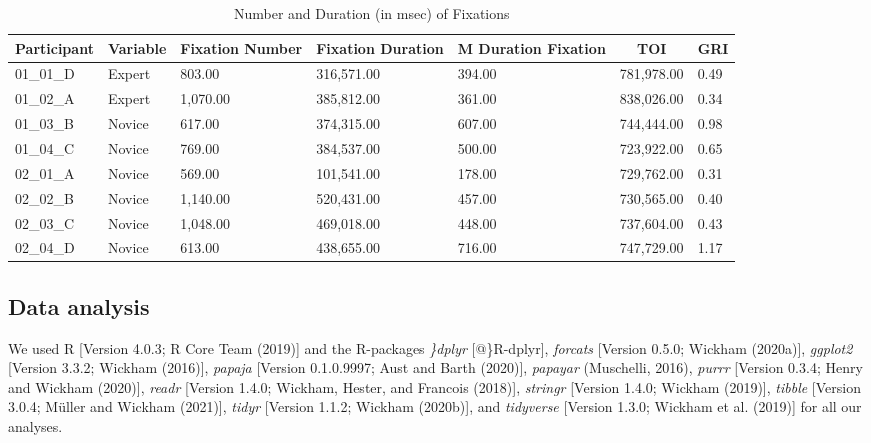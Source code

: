 \documentclass[
  english,
  man,floatsintext]{apa6}
\begin{document}
\begin{table}[h]

\begin{center}
\begin{threeparttable}

\caption{\label{tab:GRItable}Number and Duration (in msec) of Fixations}

\scriptsize{

\begin{tabular}{lllllll}
\toprule
Participant & \multicolumn{1}{c}{Variable} & \multicolumn{1}{c}{Fixation Number} & \multicolumn{1}{c}{Fixation Duration} & \multicolumn{1}{c}{M Duration Fixation} & \multicolumn{1}{c}{TOI} & \multicolumn{1}{c}{GRI}\\
\midrule
01\_01\_D & Expert & 803.00 & 316,571.00 & 394.00 & 781,978.00 & 0.49\\
01\_02\_A & Expert & 1,070.00 & 385,812.00 & 361.00 & 838,026.00 & 0.34\\
01\_03\_B & Novice & 617.00 & 374,315.00 & 607.00 & 744,444.00 & 0.98\\
01\_04\_C & Novice & 769.00 & 384,537.00 & 500.00 & 723,922.00 & 0.65\\
02\_01\_A & Novice & 569.00 & 101,541.00 & 178.00 & 729,762.00 & 0.31\\
02\_02\_B & Novice & 1,140.00 & 520,431.00 & 457.00 & 730,565.00 & 0.40\\
02\_03\_C & Novice & 1,048.00 & 469,018.00 & 448.00 & 737,604.00 & 0.43\\
02\_04\_D & Novice & 613.00 & 438,655.00 & 716.00 & 747,729.00 & 1.17\\
\bottomrule
\end{tabular}

}

\end{threeparttable}
\end{center}

\end{table}

\hypertarget{data-analysis}{%
\subsection{Data analysis}\label{data-analysis}}

We used R {[}Version 4.0.3; R Core Team (2019){]} and the R-packages \emph{\}dplyr} {[}@\}R-dplyr{]}, \emph{forcats} {[}Version 0.5.0; Wickham (2020a){]}, \emph{ggplot2} {[}Version 3.3.2; Wickham (2016){]}, \emph{papaja} {[}Version 0.1.0.9997; Aust and Barth (2020){]}, \emph{papayar} (Muschelli, 2016), \emph{purrr} {[}Version 0.3.4; Henry and Wickham (2020){]}, \emph{readr} {[}Version 1.4.0; Wickham, Hester, and Francois (2018){]}, \emph{stringr} {[}Version 1.4.0; Wickham (2019){]}, \emph{tibble} {[}Version 3.0.4; Müller and Wickham (2021){]}, \emph{tidyr} {[}Version 1.1.2; Wickham (2020b){]}, and \emph{tidyverse} {[}Version 1.3.0; Wickham et al. (2019){]} for all our analyses.
\end{document}
